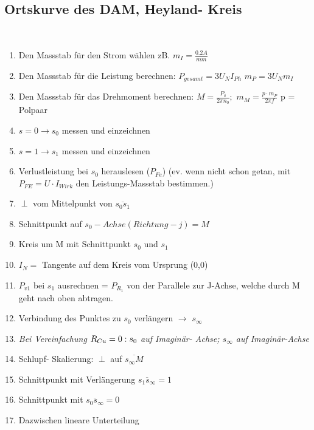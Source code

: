	\subsection{Ortskurve des DAM, Heyland- Kreis}
	\begin{minipage}{9cm}
    \end{minipage}
	\begin{minipage}{8cm}
    \end{minipage}\\
	\begin{minipage}{10.5cm}
	\begin{enumerate}	  

          \item Den Massstab für den Strom wählen zB. $m_I=\frac{0.2 A}{mm}$

          \item Den Massstab für die Leistung berechnen: $P_{gesamt}=3U_N
          I_{Ph}$ $m_P=3U_N m_I$
          \item Den Massstab für das Drehmoment berechnen:
          $M=\frac{P_\delta}{2\pi n_0};$  $m_M= \frac{p\cdot m_P}{2\pi f}$  p =
          Polpaar

          \item $s=0 \rightarrow s_{0}$ messen und einzeichnen
          \item $s=1 \rightarrow s_{1}$ messen und einzeichnen
          \item Verlustleistung bei $s_{0}$ herauslesen ($P_{Fe}$) (ev. wenn
          nicht schon getan, mit \\ $P_{FE} = U \cdot I_{Wirk}$ den
          Leistungs-Massstab bestimmen.)\\
          \item $\perp$ vom Mittelpunkt von $\overline{s_{0}s_{1}}$
          \item Schnittpunkt auf $s_{0}- Achse (Richtung -j) = M$
          \item Kreis um M mit Schnittpunkt $s_{0}$ und $s_{1}$
          \item $I_N =$ Tangente auf dem Kreis vom Ursprung (0,0)
          \item $P_{v1}$ bei $s_{1}$ ausrechnen = $P_{R_1}$ von der Parallele zur J-Achse, welche durch M geht nach oben
          abtragen.
          \item Verbindung des Punktes zu $s_{0}$ verlängern $\rightarrow$
          		$s_{\infty}$
          \item \textit{ Bei Vereinfachung $R_{Cu}=0:\\ s_{0}$ auf Imaginär- Achse;
          		$s_{\infty}$ auf Imaginär-Achse}
          \item Schlupf- Skalierung: $\perp$ auf $\overline{s_{\infty}M}$
          \item Schnittpunkt mit Verlängerung $\overline{s_{1}s_{\infty}}= 1$
          \item Schnittpunkt mit $\overline{s_{0}s_{\infty}}= 0$
          \item Dazwischen lineare Unterteilung
    \end{enumerate}
    \end{minipage}
